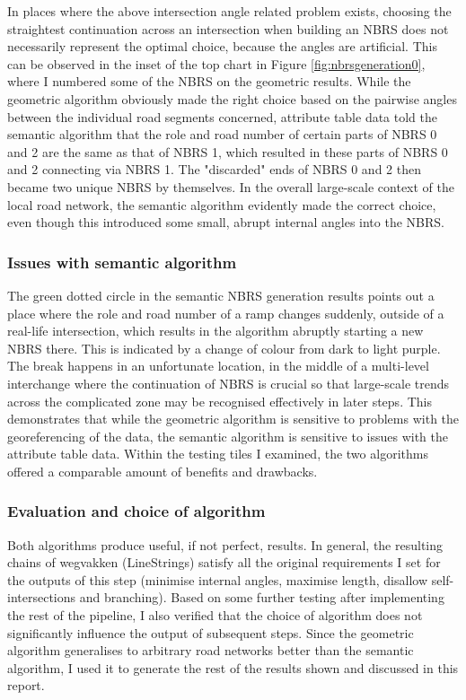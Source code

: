 In places where the above intersection angle related problem exists, choosing the straightest continuation across an intersection when building an NBRS does not necessarily represent the optimal choice, because the angles are artificial. This can be observed in the inset of the top chart in Figure \ref{fig:nbrsgeneration0}, where I numbered some of the NBRS on the geometric results. While the geometric algorithm obviously made the right choice based on the pairwise angles between the individual road segments concerned, attribute table data told the semantic algorithm that the role and road number of certain parts of NBRS 0 and 2 are the same as that of NBRS 1, which resulted in these parts of NBRS 0 and 2 connecting via NBRS 1. The "discarded" ends of NBRS 0 and 2 then became two unique NBRS by themselves. In the overall large-scale context of the local road network, the semantic algorithm evidently made the correct choice, even though this introduced some small, abrupt internal angles into the NBRS.

\subsubsection{Issues with semantic algorithm}

The green dotted circle in the semantic NBRS generation results points out a place where the role and road number of a ramp changes suddenly, outside of a real-life intersection, which results in the algorithm abruptly starting a new NBRS there. This is indicated by a change of colour from dark to light purple. The break happens in an unfortunate location, in the middle of a multi-level interchange where the continuation of NBRS is crucial so that large-scale trends across the complicated zone may be recognised effectively in later steps. This demonstrates that while the geometric algorithm is sensitive to problems with the georeferencing of the data, the semantic algorithm is sensitive to issues with the attribute table data. Within the testing tiles I examined, the two algorithms offered a comparable amount of benefits and drawbacks.

\subsubsection{Evaluation and choice of algorithm}

Both algorithms produce useful, if not perfect, results. In general, the resulting chains of wegvakken (LineStrings) satisfy all the original requirements I set for the outputs of this step (minimise internal angles, maximise length, disallow self-intersections and branching). Based on some further testing after implementing the rest of the pipeline, I also verified that the choice of algorithm does not significantly influence the output of subsequent steps. Since the geometric algorithm generalises to arbitrary road networks better than the semantic algorithm, I used it to generate the rest of the results shown and discussed in this report.

